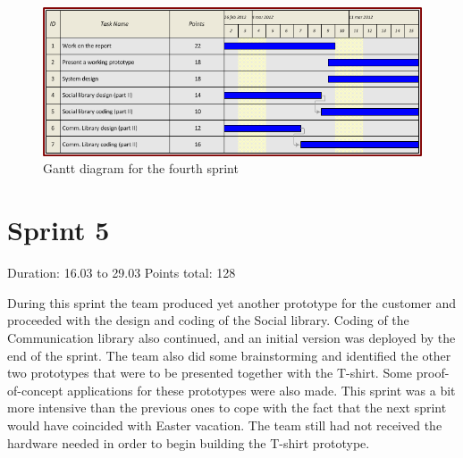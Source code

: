 \begin{figure}[h!]
\centering \includegraphics[scale=0.8]{img/sprints-gantt4.png}
\caption{Gantt diagram for the fourth sprint}
\label{fig:sprints-gantt4}
\end{figure}

\newpage

\section{Sprint 5}

Duration: 16.03 to 29.03
Points total: 128

During this sprint the team produced yet another prototype for the customer
and proceeded with the design and coding of the Social library. Coding of the
Communication library also continued, and an initial version was deployed by the
end of the sprint. The team also did some brainstorming and identified the other
two prototypes that were to be presented together with the T-shirt. Some
proof-of-concept applications for these prototypes were also made. This sprint
was a bit more intensive than the previous ones to cope with the fact that the
next sprint would have coincided with Easter vacation. The team still had not
received the hardware needed in order to begin building the T-shirt
prototype.

